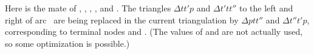 Here  is the mate of , , , ,
and . The triangles $\Delta tt'p$ and $\Delta
t'tt''$ to the
left and right of arc~ are being replaced in the current triangulation
by $\Delta ptt''$ and $\Delta t''t'p$, corresponding to terminal nodes
 and . (The values of  and  are not
actually used, so
some optimization is possible.)

